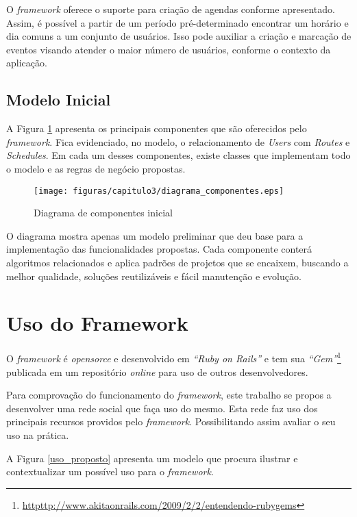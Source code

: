 O \textit{framework} oferece o suporte para criação de agendas conforme apresentado. Assim, é possível a partir de um período pré-determinado encontrar um horário e dia comuns a um conjunto de usuários. Isso pode auxiliar a criação e marcação de eventos visando atender o maior número de usuários, conforme o contexto da aplicação.

\subsection{Modelo Inicial}

A Figura \ref{diagrama de componentes} apresenta os principais componentes que são oferecidos pelo \textit{framework}. Fica evidenciado, no modelo, o relacionamento de \textit{Users} com \textit{Routes} e \textit{Schedules}. Em cada um desses componentes, existe classes que implementam todo o modelo e as regras de negócio propostas.

\begin{figure}[!h]
	\centering
	\texttt{[image: figuras/capitulo3/diagrama\_componentes.eps]}
	\caption{Diagrama de componentes inicial}
	\label{diagrama de componentes}
\end{figure}

O diagrama mostra apenas um modelo preliminar que deu base para a implementação das funcionalidades propostas. Cada componente conterá algoritmos relacionados e aplica padrões de projetos que se encaixem, buscando a melhor qualidade, soluções reutilizáveis e fácil manutenção e evolução.

\section{Uso do Framework}

O \textit{framework} é \textit{opensorce} e desenvolvido em \textit{``Ruby on Rails''} e tem sua \textit{``Gem''}\footnote{\url{httpttp://www.akitaonrails.com/2009/2/2/entendendo-rubygems}} publicada em um repositório \textit{online} para uso de outros desenvolvedores.

Para comprovação do funcionamento do \textit{framework}, este trabalho se propos a desenvolver uma rede social que faça uso do mesmo. Esta rede faz uso dos principais recursos providos pelo \textit{framework}. Possibilitando assim avaliar o seu uso na prática.

A Figura \ref{uso_proposto} apresenta um modelo que procura ilustrar e contextualizar um possível uso para o \textit{framework}.

